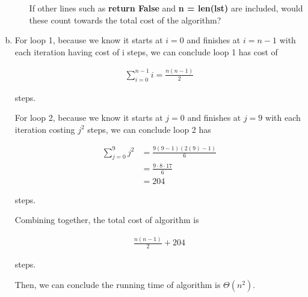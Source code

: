 \documentclass[12pt]{article}
\begin{document}
\begin{enumerate}[a.]
\begin{itemize}
        If other lines such as \textbf{return False} and \textbf{n = len(lst)} are
        included, would these count towards the total cost of the algorithm?

    \end{itemize}

    \item

    For loop 1, because we know it starts at $i = 0$ and finishes at $i = n - 1$ with each
    iteration having cost of i steps, we can conclude loop 1 has cost of

    \setcounter{equation}{0}
    \begin{align}
        \sum\limits_{i=0}^{n-1} i = \frac{n(n-1)}{2}
    \end{align}

    steps.

    \bigskip

    For loop 2, because we know it starts at $j = 0$ and finishes at $j = 9$ with
    each iteration costing $j^2$ steps, we can conclude loop 2 has

    \begin{align}
        \sum\limits_{j=0}^{9} j^2 &= \frac{9(9-1)(2(9)-1)}{6}\\
        &= \frac{9 \cdot 8 \cdot 17}{6}\\
        &= 204
    \end{align}

    steps.

    \bigskip

    Combining together, the total cost of algorithm is

    \begin{align}
        \frac{n(n-1)}{2} + 204
    \end{align}

    steps.

    \bigskip

    Then, we can conclude the running time of algorithm is $\Theta(n^2)$.



\end{enumerate}
\end{document}
